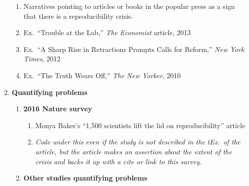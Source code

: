 \documentclass[
]{scrartcl}
\begin{document}
\begin{enumerate}
  \begin{enumerate}

  \item
    Narratives pointing to articles or books in the popular press as a
    sign that there is a reproducibility crisis.
  \item
    Ex.~``Trouble at the Lab,'' \emph{The Economist }article, 2013
  \item
    Ex.~``A Sharp Rise in Retractions Prompts Calls for Reform,''
    \emph{New York Times}, 2012
  \item
    Ex.~``The Truth Wears Off,'' \emph{The New Yorker}, 2010
  \end{enumerate}
\item
  \textbf{Quantifying problems}

  \begin{enumerate}

  \item
    \textbf{2016 Nature survey}

    \begin{enumerate}
    
    \item
      Monya Baker's ``1,500 scientists lift the lid on reproducibility''
      article
    \item
      \emph{Code under this even if the study is not described in the
      tEx.~of the article, but the article makes an assertion about the
      extent of the crisis and backs it up with a cite or link to this
      survey.}
    \end{enumerate}
  \item
    \textbf{Other studies quantifying problems}

    \begin{enumerate}
    

\end{enumerate}
\end{enumerate}
\end{enumerate}
\end{document}
